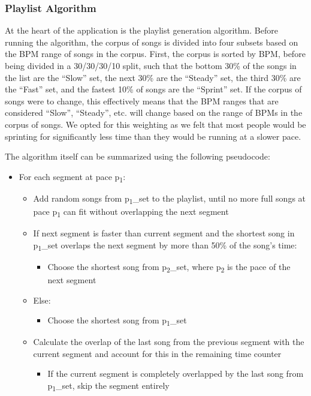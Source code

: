 \documentclass{article}
\begin{document}
\subsubsection{Playlist Algorithm}

At the heart of the application is the playlist generation algorithm. Before running the algorithm, the corpus of songs is divided into four subsets based on the BPM range of songs in the corpus. First, the corpus is sorted by BPM, before being divided in a 30/30/30/10 split, such that the bottom 30\% of the songs in the list are the ``Slow'' set, the next 30\% are the ``Steady'' set, the third 30\% are the ``Fast'' set, and the fastest 10\% of songs are the ``Sprint'' set. If the corpus of songs were to change, this effectively means that the BPM ranges that are considered ``Slow'', ``Steady'', etc. will change based on the range of BPMs in the corpus of songs. We opted for this weighting as we felt that most people would be sprinting for significantly less time than they would be running at a slower pace.

The algorithm itself can be summarized using the following pseudocode:
\begin{itemize}
\item For each segment at pace p\textsubscript{1}:
	\begin{itemize}
	\item Add random songs from p\textsubscript{1}\_set to the playlist, until no more full songs at pace p\textsubscript{1} can fit without overlapping the next segment
	\item If next segment is faster than current segment and the shortest song in p\textsubscript{1}\_set overlaps the next segment by more than 50\% of the song's time:
		\begin{itemize}
		\item Choose the shortest song from p\textsubscript{2}\_set, where p\textsubscript{2} is the pace of the next segment
		\end{itemize}
	\item Else:
		\begin{itemize}
		\item Choose the shortest song from p\textsubscript{1}\_set
		\end{itemize}
	\item Calculate the overlap of the last song from the previous segment with the current segment and account for this in the remaining time counter
		\begin{itemize}
		\item If the current segment is completely overlapped by the last song from p\textsubscript{1}\_set, skip the segment entirely
		\end{itemize}
	\end{itemize}
\end{itemize}
\end{document}
